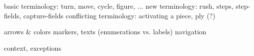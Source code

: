 \clearpage %

\noindent
\textrightarrow basic terminology: turn, move, cycle, figure, ... \newline
\textrightarrow new terminology: rush, steps, step-fields, capture-fields \newline
\textrightarrow conflicting terminology: activating a piece, ply (?) \newline

\noindent
\textrightarrow arrows \& colors \newline
\textrightarrow markers, texts (enumerations vs. labels) \newline
\textrightarrow navigation \newline

\noindent
\textrightarrow context, exceptions \newline

\clearpage %
